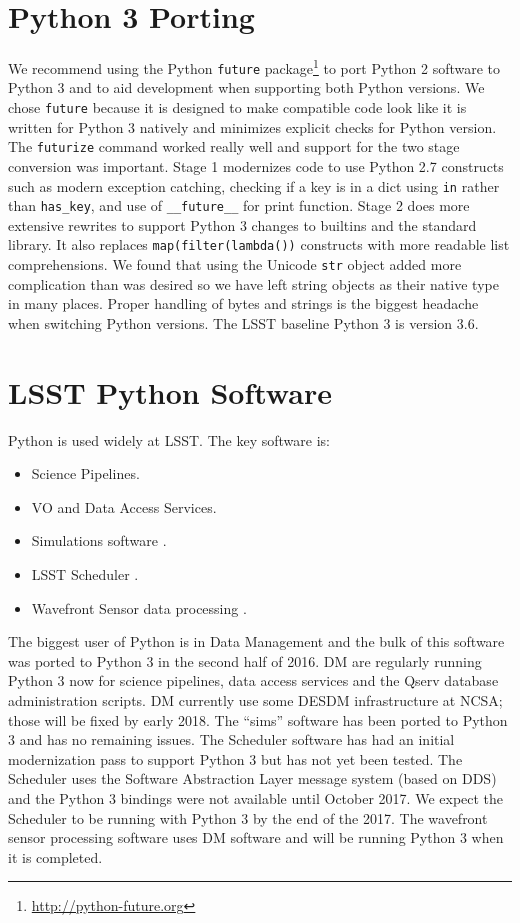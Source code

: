 \documentclass[11pt,twoside]{article}
\begin{document}
\section{Python 3 Porting}

We recommend using the Python \verb|future| package\footnote{\url{http://python-future.org}} to port Python 2 software to Python 3 and to aid development when supporting both Python versions.
We chose \verb|future| because it is designed to make compatible code look like it is written for Python 3 natively and minimizes explicit checks for Python version.
The \verb|futurize| command worked really well and support for the two stage conversion was important.
Stage 1 modernizes code to use Python 2.7 constructs such as modern exception catching, checking if a key is in a dict using \verb|in| rather than \verb|has_key|, and use of \verb|__future__| for print function.
Stage 2 does more extensive rewrites to support Python 3 changes to builtins and the standard library.
It also replaces \verb|map(filter(lambda())| constructs with more readable list comprehensions.
We found that using the Unicode \verb|str| object added more complication than was desired so we have left string objects as their native type in many places.
Proper handling of bytes and strings is the biggest headache when switching Python versions.
The LSST baseline Python 3 is version 3.6.

\section{LSST Python Software}

Python is used widely at LSST. The key software is:
\begin{itemize}
\item Science Pipelines.
\item VO and Data Access Services.
\item Simulations software \citep{2014SPIE.9150E..14C}.
\item LSST Scheduler \citep{2016SPIE.9910E..13D}.
\item Wavefront Sensor data processing \citep{2016SPIE.9906E..3BT}.
\end{itemize}
The biggest user of Python is in Data Management \citep[DM;][]{O3-1_adassxxv} and the bulk of this software was ported to Python 3 in the second half of 2016.
DM are regularly running Python 3 now for science pipelines, data access services and the Qserv database administration scripts.
DM currently use some DESDM infrastructure at NCSA; those will be fixed by early 2018.
The ``sims'' software has been ported to Python 3 and has no remaining issues.
The Scheduler software has had an initial modernization pass to support Python 3 but has not yet been tested.
The Scheduler uses the Software Abstraction Layer \citep[SAL;][]{2016SPIE.9906E..5CM} message system (based on DDS) \citep{2016SPIE.9911E..25R} and the Python 3 bindings were not available until October 2017.
We expect the Scheduler to be running with Python 3 by the end of the 2017.
The wavefront sensor processing software uses DM software and will be running Python 3 when it is completed.
\end{document}
